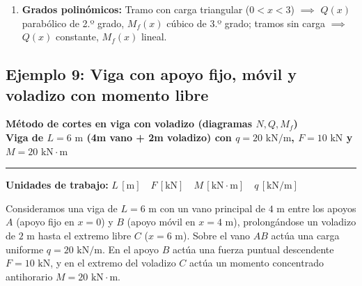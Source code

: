 {\begin{enumerate}
\begin{itemize}
                  \item En $x = 5\text{ m}$ actúa el momento antihorario $M = 20\text{ kN}\cdot\text{m}$: salto en el momento flector de $\Delta M_f = 80 - 100 = -20\text{ kN}\cdot\text{m}$.

              \end{itemize}

        \item \textbf{Grados polinómicos:} Tramo con carga triangular ($0 < x < 3$) $\implies$ $Q(x)$ parabólico de 2.º grado, $M_f(x)$ cúbico de 3.º grado; tramos sin carga $\implies$ $Q(x)$ constante, $M_f(x)$ lineal.

    \end{enumerate}

}





\subsection{Ejemplo 9: Viga con apoyo fijo, móvil y voladizo con momento libre}



\begin{tcolorbox}[colback=blue!3!white, colframe=blue!40!black, arc=3pt, boxrule=0.8pt, left=8pt, right=8pt, top=6pt, bottom=6pt]

    \centering

    {\Large\bfseries\color{blue!60!black} Método de cortes en viga con voladizo (diagramas $N, Q, M_f$)}\\[2pt]

    {\normalsize\bfseries Viga de $L = 6\text{ m}$ (4m vano + 2m voladizo) con $q = 20\text{ kN/m}$, $F = 10\text{ kN}$ y $M = 20\text{ kN}\cdot\text{m}$}



    \vspace{4pt}\hrule\vspace{4pt}

    {\small\textbf{Unidades de trabajo:} $L\,[\text{m}] \quad F\,[\text{kN}] \quad M\,[\text{kN}\cdot\text{m}] \quad q\,[\text{kN/m}]$}

\end{tcolorbox}






Consideramos una viga de $L = 6\text{ m}$ con un vano principal de $4\text{ m}$ entre los apoyos $A$ (apoyo fijo en $x=0$) y $B$ (apoyo móvil en $x=4\text{ m}$), prolongándose un voladizo de $2\text{ m}$ hasta el extremo libre $C$ ($x=6\text{ m}$). Sobre el vano $AB$ actúa una carga uniforme $q = 20\text{ kN/m}$. En el apoyo $B$ actúa una fuerza puntual descendente $F = 10\text{ kN}$, y en el extremo del voladizo $C$ actúa un momento concentrado antihorario $M = 20\text{ kN}\cdot\text{m}$.



